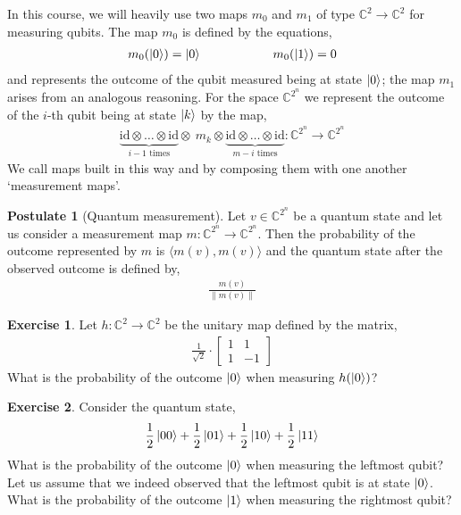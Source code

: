 \documentclass[a4paper, 11pt]{article}
\newcommand{\complex}{\mathbb{C}}
\newcommand{\id}{\mathrm{id}}
\theoremstyle{definition}
\newtheorem{exercise}{Exercise}
\newtheorem{postulate}{Postulate}
\begin{document}
In this course, we will heavily use two maps $m_0$ and $m_1$ of type
$\complex^2 \to \complex^2$ for measuring qubits. The map $m_0$ is
defined by the equations,
\begin{align*}
  m_0 (\ket{0}) = \ket{0} \hspace{2cm} m_0 (\ket{1}) = 0
\end{align*}
and represents the outcome of the qubit measured being at state
$\ket{0}$; the map $m_1$ arises from an analogous reasoning. For the
space $\complex^{2^n}$ we represent the outcome of the $i$-th
qubit being at state $\ket{k}$ by the map,
\begin{align*}
  \underbrace{\id \otimes \dots \otimes \id}_{i-1 \text{ times}} \otimes\ m_k \otimes
  \underbrace{\id \otimes \dots \otimes \id}_{m - i  \text{ times}}
  : \complex^{2^n} \to \complex^{2^n}
\end{align*}
We call maps built in this way and by composing them with one another
`measurement maps'.

\begin{postulate}[Quantum measurement]
  Let $v \in \complex^{2^n}$ be a quantum state and let us consider a
  measurement map $m : \complex^{2^n} \to \complex^{2^n}$. Then the
  probability of  the outcome represented by $m$ is
  $\langle m(v), m(v) \rangle$ and the quantum state after the
  observed outcome is defined by,
  \begin{align*}
    \frac{m(v)}{\| m(v) \|}
  \end{align*}
\end{postulate}

\begin{exercise}
  Let $h : \complex^2 \to \complex^2$ be the unitary map defined by
  the matrix,
  \begin{align*} \frac{1}{\sqrt{2}} \cdot
     \begin{bmatrix}
       1 & 1 \\
       1 & -1
  \end{bmatrix}
  \end{align*}
  What is the probability of the outcome $\ket{0}$ when measuring
  $h(\ket{0})$?
\end{exercise}

\begin{exercise}
  Consider the quantum state,
  \begin{align*}
    \frac{1}{2} \ket{00} + \frac{1}{2} \ket{01} + \frac{1}{2} \ket{10} +
    \frac{1}{2} \ket{11}
  \end{align*}
  What is the probability of the outcome $\ket{0}$ when measuring the
  leftmost qubit? Let us assume that we indeed observed that the
  leftmost qubit is at state $\ket{0}$. What is the probability of
  the outcome $\ket{1}$ when measuring the rightmost qubit?
\end{exercise}
\end{document}
